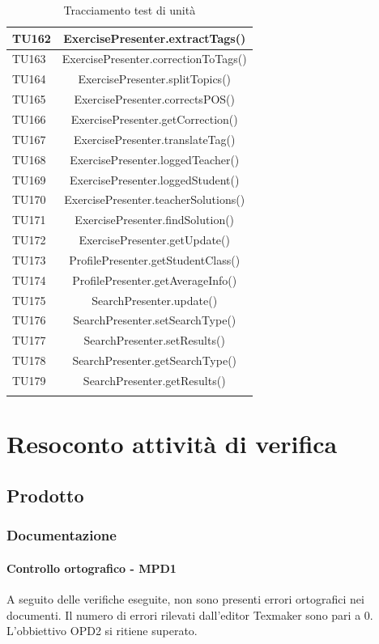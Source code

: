 \begin{longtable}{|>{\centering\arraybackslash}m{1.6cm}|c|}
		TU162 & ExercisePresenter.extractTags()\\ \hline
		TU163 & ExercisePresenter.correctionToTags()\\ \hline
		TU164 & ExercisePresenter.splitTopics()\\ \hline
		TU165 & ExercisePresenter.correctsPOS()\\ \hline
		TU166 & ExercisePresenter.getCorrection()\\ \hline
		TU167 & ExercisePresenter.translateTag()\\ \hline
		TU168 & ExercisePresenter.loggedTeacher()\\ \hline
		TU169 & ExercisePresenter.loggedStudent()\\ \hline
		TU170 & ExercisePresenter.teacherSolutions()\\ \hline
		TU171 & ExercisePresenter.findSolution()\\ \hline
		TU172 & ExercisePresenter.getUpdate()\\ \hline
		TU173 & ProfilePresenter.getStudentClass()\\ \hline
		TU174 & ProfilePresenter.getAverageInfo()\\ \hline
		TU175 & SearchPresenter.update()\\ \hline
		TU176 & SearchPresenter.setSearchType()\\ \hline
		TU177 & SearchPresenter.setResults()\\ \hline
		TU178 & SearchPresenter.getSearchType()\\ \hline
		TU179 & SearchPresenter.getResults()\\ \hline
		
		\caption{Tracciamento test di unità}
\end{longtable}

	
\newpage
\section{Resoconto attività di verifica}
\subsection{Prodotto}
\subsubsection{Documentazione}
\paragraph{Controllo ortografico - MPD1\\}
A seguito delle verifiche eseguite, non sono presenti errori ortografici nei documenti. Il numero di errori rilevati dall'editor Texmaker sono pari a 0.\\
L'obbiettivo OPD2 si ritiene superato.

